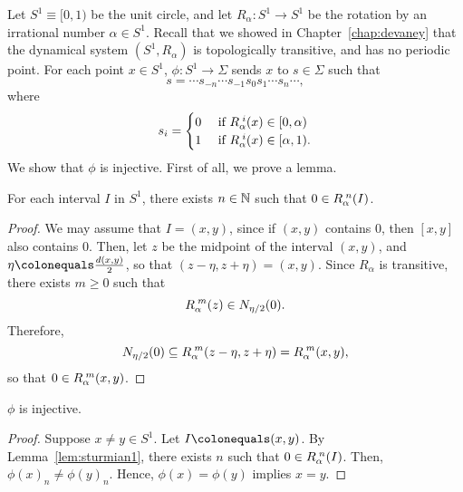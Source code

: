 \documentclass[10pt,twoside,draft]{book}
\begin{document}
\begin{example}
  Let $S^1 \equiv [0, 1)$ be the unit circle, and let $R_\alpha: S^1 \to S^1$ be the rotation by an irrational number $\alpha \in S^1$. %
  Recall that we showed in Chapter~\ref{chap:devaney} that the dynamical system $(S^1, R_\alpha)$ is topologically transitive, and has no periodic point.
  For each point $x \in S^1$, $\phi: S^1 \to \Sigma$ sends $x$ to $s \in \Sigma$ such that
  \begin{equation*}
    s = \cdots s_{-n} \cdots s_{-1} s_0 s_1 \cdots s_n \cdots,
  \end{equation*}
  where
  \begin{equation*}
    s_i = \begin{cases}
      0& \mbox{ if } \itr{R_\alpha}{i}(x) \in [0, \alpha)  \\ %
      1& \mbox{ if } \itr{R_\alpha}{i}(x) \in [\alpha, 1). %
    \end{cases}
  \end{equation*} %
  We show that $\phi$ is injective.
  First of all, we prove a lemma.
  \begin{lemma}
    For each interval $I$ in $S^1$, there exists $n \in \mathbb{N}$ such that $0 \in R_\alpha^{\;n}(I)$.
    \label{lem:sturmian1}
    \begin{proof}
      We may assume that $I = (x,y)$, since if $(x,y)$ contains $0$, then $[x,y]$ also contains $0$.
      Then, let $z$ be the midpoint of the interval $(x,y)$, and $\eta \ceq \frac{\metric{x,y}}{2}$, so that $(z-\eta, z+\eta) = (x,y)$.
      Since $R_\alpha$ is transitive, there exists $m \geq 0$ such that 
      \begin{equation*}
        R_\alpha^{\;m}(z) \in N_{\eta/2}(0).
      \end{equation*}
      Therefore,
      \begin{equation*}
        N_{\eta/2}(0) \subseteq R_\alpha^{\;m}(z-\eta, z+\eta) 
        = R_\alpha^{\;m}(x,y),
      \end{equation*}
      so that $0 \in R_\alpha^{\;m}(x,y)$.
    \end{proof}
  \end{lemma}
  \begin{proposition}
    $\phi$ is injective.
    \begin{proof}
      Suppose $x \neq y \in S^1$.
      Let $I \ceq (x,y)$.
      By Lemma~\ref{lem:sturmian1}, there exists $n$ such that $0 \in R_\alpha^{\;n}(I)$.
      Then, $\phi(x)_n \neq \phi(y)_n$.
      Hence, $\phi(x) = \phi(y)$ implies $x = y$.

\end{proof}
\end{proposition}
\end{example}
\end{document}
